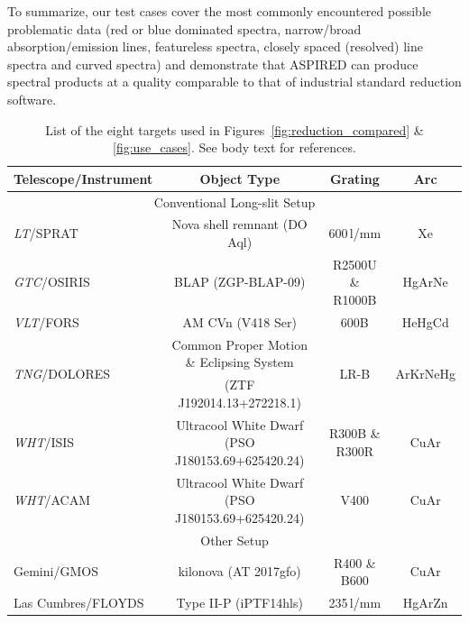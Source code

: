 \documentclass[linenumbers, twocolumn]{aastex631}
\begin{document}
To summarize, our test cases cover the most commonly encountered possible
problematic data (red or blue dominated spectra, narrow/broad
absorption/emission lines, featureless spectra, closely spaced (resolved)
line spectra and curved spectra) and demonstrate that \textsc{ASPIRED} can
produce spectral products at a quality comparable to that of industrial
standard reduction software.

\begin{table}
    \begin{tabular}{l|c|c|c}\hline
        Telescope/Instrument & Object Type                                 & Grating             & Arc \\\hline\hline
        \multicolumn{4}{c}{Conventional Long-slit Setup}\\\hline
        \textit{LT}/SPRAT      & Nova shell remnant (DO Aql)                 & 600\,l/mm           & Xe \\
        \textit{GTC}/OSIRIS           & BLAP (ZGP-BLAP-09)                          & R2500U \& R1000B    & HgArNe \\
        \textit{VLT}/FORS             & AM CVn (V418 Ser)                           & 600B                & HeHgCd \\
        \multirow{2}{*}{\textit{TNG}/DOLORES}          & Common Proper Motion \& Eclipsing System     & \multirow{2}{*}{LR-B}                & \multirow{2}{*}{ArKrNeHg} \\
                             & (ZTF J192014.13+272218.1)     &           &  \\
        \textit{WHT}/ISIS             & Ultracool White Dwarf (PSO J180153.69+625420.24)       & R300B \& R300R      & CuAr \\
        \textit{WHT}/ACAM             & Ultracool White Dwarf (PSO J180153.69+625420.24)       & V400                & CuAr \\\hline
        \multicolumn{4}{c}{Other Setup}\\\hline
        Gemini/GMOS          & kilonova (AT 2017gfo)                       & R400 \& B600        & CuAr \\
        Las Cumbres/FLOYDS           & Type II-P (iPTF14hls)                       & 235\,l/mm           & HgArZn \\\hline
\end{tabular}
    \caption{List of the eight targets used in Figures~\ref{fig:reduction_compared} \& \ref{fig:use_cases}. See body text for references.}
    \label{tab:summary}
\end{table}
\end{document}
